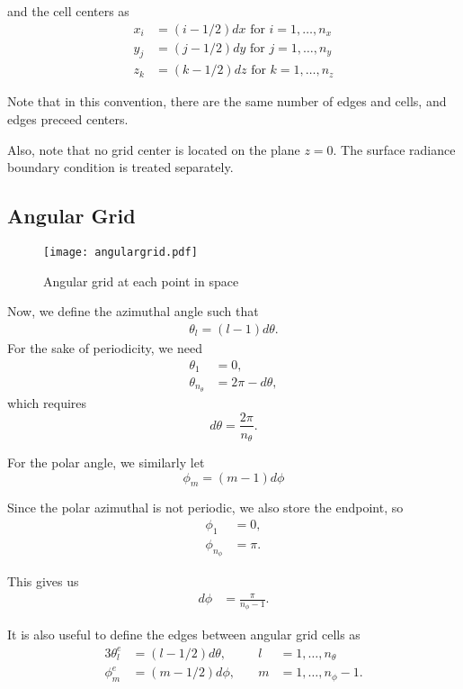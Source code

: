 and the cell centers as
\begin{align}
  x_i &= (i-1/2)dx \mbox{ for } i=1,\ldots,n_x \\
  y_j &= (j-1/2)dy \mbox{ for } j=1,\ldots,n_y \\
  z_k &= (k-1/2)dz \mbox{ for } k=1,\ldots,n_z
\end{align}

Note that in this convention, there are the same number of edges and cells,
and edges preceed centers.

Also, note that no grid center is located on the plane $z=0$.
The surface radiance boundary condition is treated separately.

\subsection{Angular Grid}
\begin{figure}[H]
  \centering
  \texttt{[image: angulargrid.pdf]}
  \caption{Angular grid at each point in space}
  \label{fig:angular_grid}
\end{figure}

Now, we define the azimuthal angle such that
\begin{align}
  \theta_l = (l-1)d\theta.
\end{align}
For the sake of periodicity, we need
\begin{align}
  \theta_1 &= 0, \\
  \theta_{n_\theta} &= 2\pi-d\theta,
\end{align}
which requires
\begin{equation}
  d\theta = \frac{2\pi}{n_\theta}.
\end{equation}

For the polar angle, we similarly let
\begin{equation}
  \phi_m = (m-1)d\phi
\end{equation}

Since the polar azimuthal is not periodic, we also store the endpoint, so
\begin{align}
  \phi_1 &= 0, \\
  \phi_{n_\phi} &= \pi.
\end{align}

This gives us
\begin{align}
  d\phi &= \frac{\pi}{n_\phi-1}.
\end{align}

It is also useful to define the edges between angular grid cells as
\begin{alignat}{3}
  \theta_l^e &= (l-1/2) d\theta, &\quad l&=1,\ldots,n_\theta \\
  \phi_m^e &= (m-1/2) d\phi, &\quad m&=1,\ldots,n_\phi-1.
\end{alignat}


